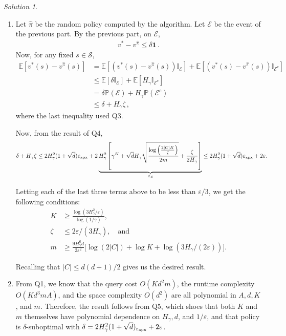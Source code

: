 \documentclass{article}
\renewcommand{\epsilon}{\varepsilon}
\newcommand{\cE}{\mathcal{E}}
\newcommand{\oneb}[1]{\mathbb{I}_{#1}}
\DeclareMathOperator*{\1}{\mathbbm{1}}
\newcommand{\E}{\mathbb E}
\newcommand{\Prob}[1]{\mathbb{P}( #1 )}
\newcommand{\EE}[1]{\E[#1]}
\newcommand{\0}{\mathbf{0}}
\theoremstyle{definition}
\theoremstyle{remark}
\newtheorem*{solution*}{Solution}
\newcommand{\cS}{\mathcal{S}}
\begin{document}
\begin{solution*}
\begin{enumerate}
\item 
Let $\hat \pi$ be the random policy computed by the algorithm.
Let $\mathcal{E}$ be the event of the previous part.
By the previous part, on $\mathcal{E}$,
\begin{align*}
v^* - v^{\hat \pi} \le \delta \boldsymbol{1}\,.
\end{align*}
Now, for any fixed $s\in \cS$, 
\begin{align*}
\EE{ v^*(s)-v^{\hat \pi}(s) } 
&= \EE{ (v^*(s)-v^{\hat \pi}(s))\oneb{\cE} } + \EE{ (v^*(s)-v^{\hat \pi}(s))\oneb{\cE^c} }  \\
&\le \EE{ \delta\oneb{\cE} } + \EE{H_\gamma \oneb{\cE^c} }  \\
&= \delta \Prob{\cE} + H_\gamma \Prob{\cE^c}   \\
&\le \delta + H_\gamma \zeta\,,
\end{align*}
where the last inequality used Q3.

Now, from the result of Q4,
  \begin{align*}
    \delta +
    H_\gamma\zeta
    &\le 2 H_\gamma^2 (1 + \sqrt{d}) \epx + 2 \underbrace{H_\gamma^2  \left[ \gamma^K + \sqrt{d} H_\gamma \sqrt{\frac{\log \left(\frac{2|C|K}{\zeta} \right)}{2m}} + \frac{\zeta}{2H_\gamma} \right]}_{\leq \epsilon} \leq 2 H_\gamma^2 (1 + \sqrt{d}) \epx + 2 \epsilon.
  \end{align*}

  Letting each of the last three terms above to be less than $\epsilon/3$, we get the following conditions:
  \begin{align*}
    K &\geq \frac{\log\left(3 H_\gamma^2/\epsilon \right)}{\log(1 / \gamma)}, \\
    \zeta &\leq 2\epsilon/(3H_\gamma), \quad \text{and} \\
    m &\geq \frac{9 H_\gamma^6 d}{2 \epsilon^2} \Bigg[\log(2|C|) + \log K + \log \left(3 H_\gamma / (2\epsilon) \right) \Bigg].
  \end{align*}

  Recalling that $|C| \leq d(d+1)/2$ gives us the desired result.
  
\item From Q1, we know that the query cost $O(Kd^2m)$, the runtime complexity $O(Kd^3mA)$, and the space complexity $O(d^2)$ are all polynomial in $A, d, K$, and $m$. Therefore, the result follows from Q5, which shoes that both $K$ and $m$ themselves have polynomial dependence on $H_\gamma, d$, and $1/\epsilon$, and that policy is $\delta$-suboptimal with $\delta = 2H_\gamma^2 (1 + \sqrt{d})_{\epx} + 2 \epsilon$.
  

\end{enumerate}
\end{solution*}
\end{document}
